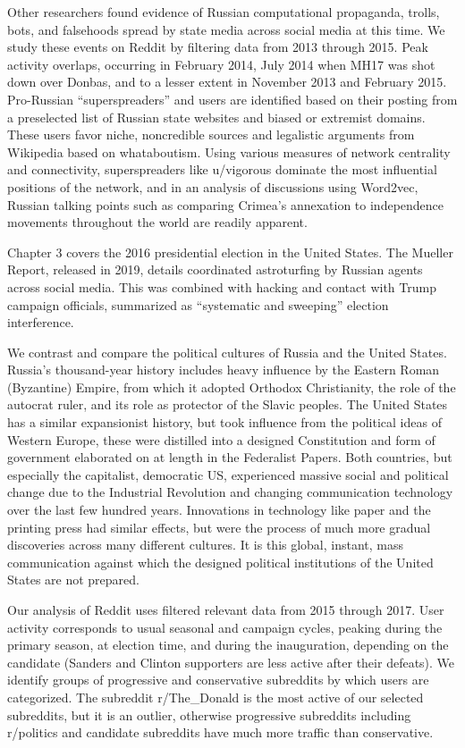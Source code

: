 \documentclass[doublespacing]{utdthesis}
\begin{document}
Other researchers found evidence of Russian computational propaganda, trolls, bots, and falsehoods spread by state media across social media at this time.
We study these events on Reddit by filtering data from 2013 through 2015.
Peak activity overlaps, occurring in February 2014, July 2014 when MH17 was shot down over Donbas, and to a lesser extent in November 2013 and February 2015.
Pro-Russian ``superspreaders'' and users are identified based on their posting from a preselected list of Russian state websites and biased or extremist domains. 
These users favor niche, noncredible sources and legalistic arguments from Wikipedia based on whataboutism.
Using various measures of network centrality and connectivity, superspreaders like u/vigorous dominate the most influential positions of the network, and in an analysis of discussions using Word2vec, Russian talking points such as comparing Crimea's annexation to independence movements throughout the world are readily apparent. 

Chapter 3 covers the 2016 presidential election in the United States.
The Mueller Report, released in 2019, details coordinated astroturfing by Russian agents across social media.
This was combined with hacking and contact with Trump campaign officials, summarized as ``systematic and sweeping'' election interference.

We contrast and compare the political cultures of Russia and the United States.
Russia's thousand-year history includes heavy influence by the Eastern Roman (Byzantine) Empire, from which it adopted Orthodox Christianity, the role of the autocrat ruler, and its role as protector of the Slavic peoples.
The United States has a similar expansionist history, but took influence from the political ideas of Western Europe, these were distilled into a designed Constitution and form of government elaborated on at length in the Federalist Papers.
Both countries, but especially the capitalist, democratic US, experienced massive social and political change due to the Industrial Revolution and changing communication technology over the last few hundred years.
Innovations in technology like paper and the printing press had similar effects, but were the process of much more gradual discoveries across many different cultures.
It is this global, instant, mass communication against which the designed political institutions of the United States are not prepared.

Our analysis of Reddit uses filtered relevant data from 2015 through 2017.
User activity corresponds to usual seasonal and campaign cycles, peaking during the primary season, at election time, and during the inauguration, depending on the candidate (Sanders and Clinton supporters are less active after their defeats).
We identify groups of progressive and conservative subreddits by which users are categorized.
The subreddit r/The\_Donald is the most  active of our selected subreddits, but it is an outlier, otherwise progressive subreddits including r/politics and candidate subreddits have much more traffic than conservative.
\end{document}
